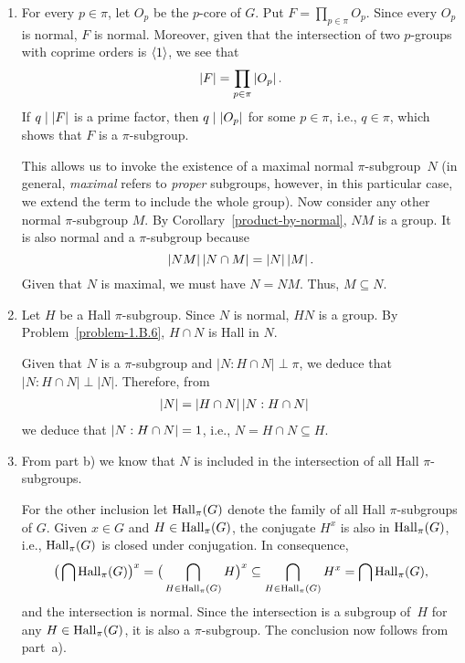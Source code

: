 \begin{solution}
\begin{enumerate}[\rm a)]
    \item For every\/ $p\in\pi$, let $O_p$ be the $p$-core of $G$. Put $F=\prod_{p\in\pi}O_p$. Since every $O_p$ is normal, $F$ is normal. Moreover, given that the intersection of two $p$-groups with coprime orders is $\langle1\rangle$, we see that
    $$
        \left\vert{F}\right\vert= \prod_{p\in\pi}\left\vert{O_p}\right\vert.
    $$
    If $q\mid\left\vert{F}\right\vert$ is a prime factor, then $q\mid\left\vert{O_p}\right\vert$ for some $p\in\pi$, i.e., $q\in\pi$, which shows that $F$ is a $\pi$-subgroup. 

    
    This allows us to invoke the existence of a maximal normal $\pi$-subgroup~$N$ (in general, \textit{maximal\/} refers to \textit{proper\/} subgroups, however, in this particular case, we extend the term to include the whole group). Now consider any other normal $\pi$-subgroup $M$. By Corollary~\ref{product-by-normal}, $NM$ is a group. It is also normal and a $\pi$-subgroup because
    $$
        \left\vert{NM}\right\vert\left\vert{N\cap M}\right\vert = \left\vert{N}\right\vert\left\vert{M}\right\vert.
    $$
    Given that $N$ is maximal, we must have $N=NM$. Thus, $M\subseteq N$.

    \item Let $H$ be a Hall $\pi$-subgroup. Since $N$ is normal, $HN$ is a group. By Problem~\ref{problem-1.B.6}, $H\cap N$ is Hall in $N$.

    Given that $N$ is a $\pi$-subgroup and $|N:H\cap N|\perp\pi$, we deduce that $|N:H\cap N|\perp|N|$. Therefore, from
    \begin{align*}
        \left\vert{N}\right\vert&=\left\vert{H\cap N}\right\vert\left\vert{N:H\cap N}\right\vert
    \end{align*}
    we deduce that $\left\vert{N:H\cap N}\right\vert=1$, i.e., $N=H\cap N\subseteq H$.
    
    \item From part b) we know that $N$ is included in the intersection of all Hall $\pi$-subgroups.

    For the other inclusion let ${\rm Hall}_\pi(G)$ denote the family of all Hall $\pi$-subgroups of $G$. Given $x\in G$ and $H\in{\rm Hall}_\pi(G)$, the conjugate $H^x$ is also in ${\rm Hall}_\pi(G)$, i.e., ${\rm Hall}_\pi(G)$ is closed under conjugation. In consequence,
    $$
        \big(\bigcap{{\rm Hall}_\pi(G)}\big)^x
            =\big(\bigcap_{H\in{\rm Hall}_\pi(G)}H\big)^x
            \subseteq \bigcap_{H\in{\rm Hall}_\pi(G)}H^x 
            = \bigcap{{\rm Hall}_\pi(G)},
    $$
    and the intersection is normal. Since the intersection is a subgroup of~$H$ for any $H\in{{\rm Hall}_\pi(G)}$, it is also a $\pi$-subgroup. The conclusion now follows from part~a).
\end{enumerate}
\end{solution}

